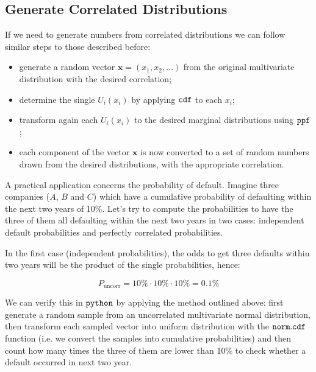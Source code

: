 

\subsection{Generate Correlated Distributions}\label{generate-correlated-distributions}

If we need to generate numbers from correlated distributions we can
follow similar steps to those described before:

\begin{itemize}
\tightlist
\item
  generate a random vector \(\mathbf{x}=(x_1, x_2,\ldots)\) from the
  original multivariate distribution with the desired correlation;
\item
  determine the single \(U_i(x_i)\) by applying \(\tt{cdf}\) to each
  \(x_i\);
\item
  transform again each \(U_i(x_i)\) to the desired marginal
  distributions using \(\tt{ppf}\);
\item
  each component of the vector \(\mathbf{x}\) is now converted to a set
  of random numbers drawn from the desired distributions, with the
  appropriate correlation.
\end{itemize}

A practical application concerns the probability of default. 
Imagine three companies ($A$, $B$ and $C$) which have a
cumulative probability of defaulting within the next two years of 10\%.
Let's try to compute the probabilities to have the three of them all
defaulting within the next two years in two cases: independent default probabilities and perfectly correlated probabilities.

In the first case (independent probabilities), the
odds to get three defaults within two years will be the product
of the single probabilities, hence:

\[P_{\mathrm{uncorr}} = 10\% \cdot 10\% \cdot 10\% = 0.1 \%\]

We can verify this in \(\tt{python}\) by applying the method outlined above: first generate a random sample from an uncorrelated multivariate normal distribution, then transform each sampled vector into uniform distribution with the \(\tt{norm.cdf}\) function (i.e. we
convert the samples into cumulative probabilities) and then count how many times the
three of them are lower than 10\% to check whether a default occurred in next two year.

